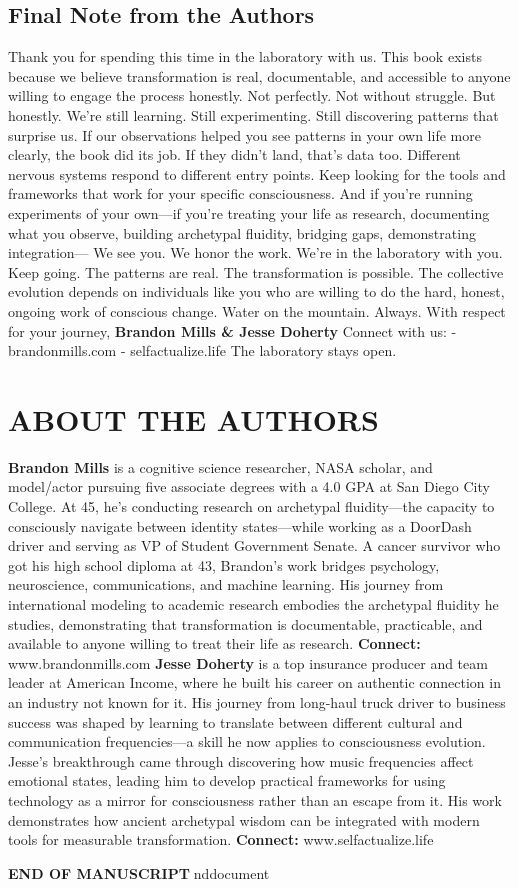 \documentclass[12pt,openany]{book}
\begin{document}
\section{Final Note from the Authors}

Thank you for spending this time in the laboratory with us.
This book exists because we believe transformation is real, documentable, and accessible to anyone willing to engage the process honestly. Not perfectly. Not without struggle. But honestly.
We're still learning. Still experimenting. Still discovering patterns that surprise us.
If our observations helped you see patterns in your own life more clearly, the book did its job.
If they didn't land, that's data too. Different nervous systems respond to different entry points. Keep looking for the tools and frameworks that work for your specific consciousness.
And if you're running experiments of your own—if you're treating your life as research, documenting what you observe, building archetypal fluidity, bridging gaps, demonstrating integration—
We see you. We honor the work. We're in the laboratory with you.
Keep going.
The patterns are real. The transformation is possible. The collective evolution depends on individuals like you who are willing to do the hard, honest, ongoing work of conscious change.
Water on the mountain. Always.
With respect for your journey,
\textbf{Brandon Mills \& Jesse Doherty}
Connect with us:
- brandonmills.com
- selfactualize.life
The laboratory stays open.

\cleardoublepage

\chapter{ABOUT THE AUTHORS}

\textbf{Brandon Mills} is a cognitive science researcher, NASA scholar, and model/actor pursuing five associate degrees with a 4.0 GPA at San Diego City College. At 45, he's conducting research on archetypal fluidity—the capacity to consciously navigate between identity states—while working as a DoorDash driver and serving as VP of Student Government Senate.
A cancer survivor who got his high school diploma at 43, Brandon's work bridges psychology, neuroscience, communications, and machine learning. His journey from international modeling to academic research embodies the archetypal fluidity he studies, demonstrating that transformation is documentable, practicable, and available to anyone willing to treat their life as research.
\textbf{Connect:} www.brandonmills.com
\textbf{Jesse Doherty} is a top insurance producer and team leader at American Income, where he built his career on authentic connection in an industry not known for it. His journey from long-haul truck driver to business success was shaped by learning to translate between different cultural and communication frequencies—a skill he now applies to consciousness evolution.
Jesse's breakthrough came through discovering how music frequencies affect emotional states, leading him to develop practical frameworks for using technology as a mirror for consciousness rather than an escape from it. His work demonstrates how ancient archetypal wisdom can be integrated with modern tools for measurable transformation.
\textbf{Connect:} www.selfactualize.life

\cleardoublepage

\textbf{END OF MANUSCRIPT}nd{document}
\end{document}
